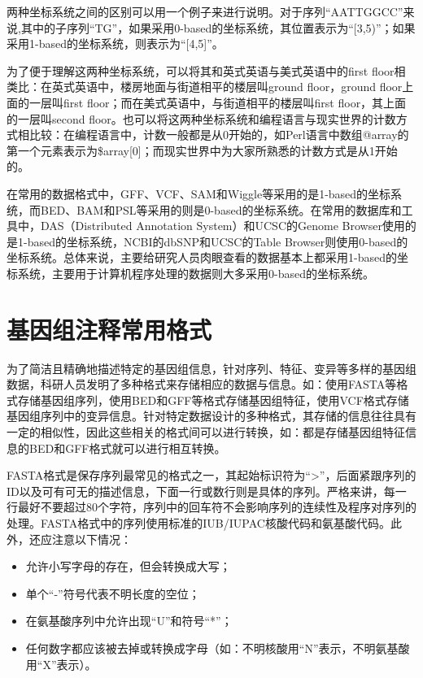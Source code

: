 两种坐标系统之间的区别可以用一个例子来进行说明。对于序列“AATTGGCC”来说,其中的子序列“TG”，如果采用0-based的坐标系统，其位置表示为“[3,5)”；如果采用1-based的坐标系统，则表示为“[4,5]”。


为了便于理解这两种坐标系统，可以将其和英式英语与美式英语中的first floor相类比：在英式英语中，楼房地面与街道相平的楼层叫ground floor，ground floor上面的一层叫first floor；而在美式英语中，与街道相平的楼层叫first floor，其上面的一层叫second floor。也可以将这两种坐标系统和编程语言与现实世界的计数方式相比较：在编程语言中，计数一般都是从0开始的，如Perl语言中数组@array的第一个元素表示为\$array[0]；而现实世界中为大家所熟悉的计数方式是从1开始的。

在常用的数据格式中，GFF、VCF、SAM和Wiggle等采用的是1-based的坐标系统，而BED、BAM和PSL等采用的则是0-based的坐标系统。在常用的数据库和工具中，DAS（Distributed Annotation System）和UCSC的Genome Browser使用的是1-based的坐标系统，NCBI的dbSNP和UCSC的Table Browser则使用0-based的坐标系统。总体来说，主要给研究人员肉眼查看的数据基本上都采用1-based的坐标系统，主要用于计算机程序处理的数据则大多采用0-based的坐标系统。

\section{基因组注释常用格式}
为了简洁且精确地描述特定的基因组信息，针对序列、特征、变异等多样的基因组数据，科研人员发明了多种格式来存储相应的数据与信息。如：使用FASTA等格式存储基因组序列，使用BED和GFF等格式存储基因组特征，使用VCF格式存储基因组序列中的变异信息。针对特定数据设计的多种格式，其存储的信息往往具有一定的相似性，因此这些相关的格式间可以进行转换，如：都是存储基因组特征信息的BED和GFF格式就可以进行相互转换。

FASTA格式是保存序列最常见的格式之一，其起始标识符为“>”，后面紧跟序列的ID以及可有可无的描述信息，下面一行或数行则是具体的序列。严格来讲，每一行最好不要超过80个字符，序列中的回车符不会影响序列的连续性及程序对序列的处理。FASTA格式中的序列使用标准的IUB/IUPAC核酸代码和氨基酸代码。此外，还应注意以下情况：
\begin{itemize}
	\item 允许小写字母的存在，但会转换成大写；
	\item 单个“-”符号代表不明长度的空位；
	\item 在氨基酸序列中允许出现“U”和符号“*”；
	\item 任何数字都应该被去掉或转换成字母（如：不明核酸用“N”表示，不明氨基酸用“X”表示）。
\end{itemize}

